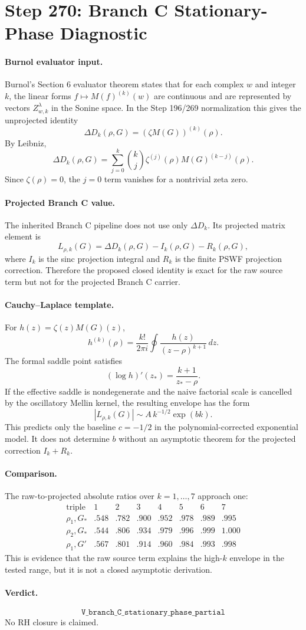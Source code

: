 \section*{Step 270: Branch C Stationary-Phase Diagnostic}

\paragraph{Burnol evaluator input.}
Burnol's Section 6 evaluator theorem states that for each complex $w$ and
integer $k$, the linear forms $f\mapsto M(f)^{(k)}(w)$ are continuous and are
represented by vectors $Z^\lambda_{w,k}$ in the Sonine space.  In the Step
196/269 normalization this gives the unprojected identity
\[
  \Delta D_k(\rho,G) = (\zeta M(G))^{(k)}(\rho).
\]
By Leibniz,
\[
  \Delta D_k(\rho,G)
   = \sum_{j=0}^{k} {k\choose j}\zeta^{(j)}(\rho) M(G)^{(k-j)}(\rho).
\]
Since $\zeta(\rho)=0$, the $j=0$ term vanishes for a nontrivial zeta zero.

\paragraph{Projected Branch C value.}
The inherited Branch C pipeline does not use only $\Delta D_k$.  Its projected
matrix element is
\[
  L_{\rho,k}(G)=\Delta D_k(\rho,G)-I_k(\rho,G)-R_k(\rho,G),
\]
where $I_k$ is the sinc projection integral and $R_k$ is the finite PSWF
projection correction.  Therefore the proposed closed identity is exact for
the raw source term but not for the projected Branch C carrier.

\paragraph{Cauchy--Laplace template.}
For $h(z)=\zeta(z)M(G)(z)$,
\[
  h^{(k)}(\rho)=\frac{k!}{2\pi i}\oint
  \frac{h(z)}{(z-\rho)^{k+1}}\,dz.
\]
The formal saddle point satisfies
\[
  (\log h)'(z_*)=\frac{k+1}{z_*-\rho}.
\]
If the effective saddle is nondegenerate and the naive factorial scale is
cancelled by the oscillatory Mellin kernel, the resulting envelope has the
form
\[
  |L_{\rho,k}(G)| \sim A\,k^{-1/2}\exp(bk).
\]
This predicts only the baseline $c=-1/2$ in the polynomial-corrected
exponential model.  It does not determine $b$ without an asymptotic theorem for
the projected correction $I_k+R_k$.

\paragraph{Comparison.}
The raw-to-projected absolute ratios over $k=1,\dots,7$ approach one:
\[
\begin{array}{c|ccccccc}
\text{triple} & 1&2&3&4&5&6&7\\\hline
\rho_1,G_* & .548&.782&.900&.952&.978&.989&.995\\
\rho_2,G_* & .544&.806&.934&.979&.996&.999&1.000\\
\rho_1,G' & .567&.801&.914&.960&.984&.993&.998
\end{array}
\]
This is evidence that the raw source term explains the high-$k$ envelope in
the tested range, but it is not a closed asymptotic derivation.

\paragraph{Verdict.}
\[
  \boxed{\texttt{V\_branch\_C\_stationary\_phase\_partial}}
\]
No RH closure is claimed.
